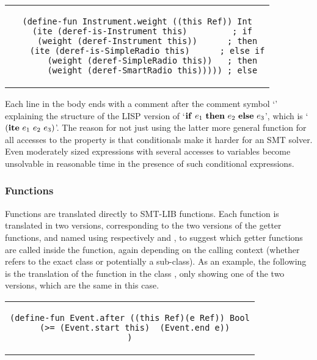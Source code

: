 \begin{center}
\begin{tabular}{c}
\begin{lstlisting}
(define-fun Instrument.weight ((this Ref)) Int
  (ite (deref-is-Instrument this)         ; if
    (weight (deref-Instrument this))      ; then
    (ite (deref-is-SimpleRadio this)      ; else if
      (weight (deref-SimpleRadio this))   ; then
      (weight (deref-SmartRadio this))))) ; else
\end{lstlisting}
\end{tabular}
\end{center}

Each line in the body ends with a comment after the comment symbol
`\code{;}' explaining the structure of the LISP version of `${\bf
  if}\ e_1\ {\bf then}\ e_2\ {\bf else}\ e_3$', which is `$({\bf
  ite}\ e_1\ e_2\ e_3)$'. The reason for not just using the latter
more general function  for all accesses to the
 property is that conditionals make it harder for an SMT
solver. Even moderately sized expressions with several accesses to
variables become unsolvable in reasonable time in the presence of such
conditional expressions. 


\subsubsection{Functions}

Functions are translated directly to SMT-LIB functions.  Each
function is translated in two versions, corresponding to the two
versions of the getter functions, and named using respectively
 and , to
suggest which getter functions are called inside the function, again
depending on the calling context (whether  refers to the exact
class or potentially a sub-class). As an example, the following is the
translation of the  function in the class , only
showing one of the two versions, which are the same in this case.

\begin{center}
\begin{tabular}{c}
\begin{lstlisting}
(define-fun Event.after ((this Ref)(e Ref)) Bool
  (>= (Event.start this)  (Event.end e))
)
\end{lstlisting}
\end{tabular}
\end{center}

